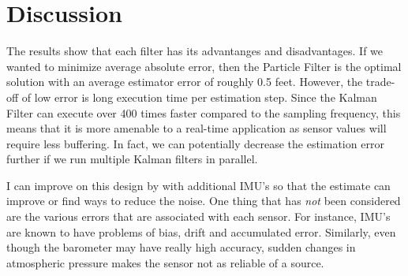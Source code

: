 \section{Discussion} \label{sec:discussion}

The results show that each filter has its advantanges and
disadvantages. If we wanted to minimize average absolute error, then
the Particle Filter is the optimal solution with an average estimator
error of roughly 0.5 feet. However, the trade-off of low error is long
execution time per estimation step. Since the Kalman Filter can
execute over 400 times faster compared to the sampling frequency, this
means that it is more amenable to a real-time application as sensor
values will require less buffering. In fact, we can potentially
decrease the estimation error further if we run multiple Kalman
filters in parallel.

I can improve on this design by with additional IMU's so that the estimate
can improve or find ways to reduce the noise. One thing that has
\textit{not} been considered are the various errors that are
associated with each sensor. For instance, IMU's are known to have
problems of bias, drift and accumulated error. Similarly, even though
the barometer may have really high accuracy, sudden changes in
atmospheric pressure makes the sensor not as reliable of a source.
